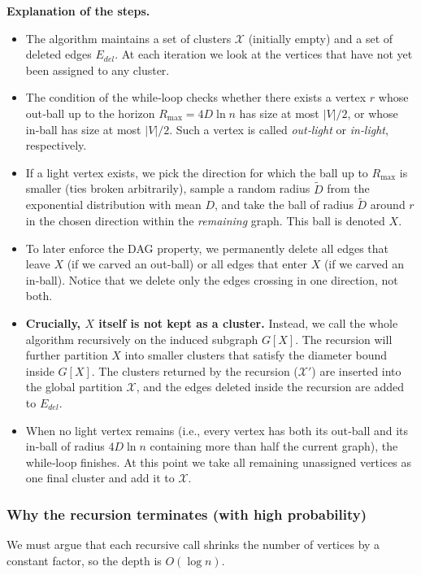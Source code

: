 \textbf{Explanation of the steps.}
\begin{itemize}
    \item The algorithm maintains a set of clusters $\mathcal{X}$ (initially empty) and a set of deleted edges $E_{del}$. At each iteration we look at the vertices that have not yet been assigned to any cluster.
    \item The condition of the while‑loop checks whether there exists a vertex $r$ whose out‑ball up to the horizon $R_{\max} = 4D\ln n$ has size at most $|V|/2$, or whose in‑ball has size at most $|V|/2$. Such a vertex is called \textit{out‑light} or \textit{in‑light}, respectively. 
    \item If a light vertex exists, we pick the direction for which the ball up to $R_{\max}$ is smaller (ties broken arbitrarily), sample a random radius $\tilde D$ from the exponential distribution with mean $D$, and take the ball of radius $\tilde D$ around $r$ in the chosen direction within the \emph{remaining} graph. This ball is denoted $X$.
    \item To later enforce the DAG property, we permanently delete all edges that leave $X$ (if we carved an out‑ball) or all edges that enter $X$ (if we carved an in‑ball). Notice that we delete only the edges crossing in one direction, not both.
    \item \textbf{Crucially, $X$ itself is not kept as a cluster.} Instead, we call the whole algorithm recursively on the induced subgraph $G[X]$. The recursion will further partition $X$ into smaller clusters that satisfy the diameter bound inside $G[X]$. The clusters returned by the recursion ($\mathcal{X}'$) are inserted into the global partition $\mathcal{X}$, and the edges deleted inside the recursion are added to $E_{del}$.
    \item When no light vertex remains (i.e., every vertex has both its out‑ball and its in‑ball of radius $4D\ln n$ containing more than half the current graph), the while‑loop finishes. At this point we take all remaining unassigned vertices as one final cluster and add it to $\mathcal{X}$.
\end{itemize}

\subsubsection{Why the recursion terminates (with high probability)}

We must argue that each recursive call shrinks the number of vertices by a constant factor, so the depth is $O(\log n)$.

